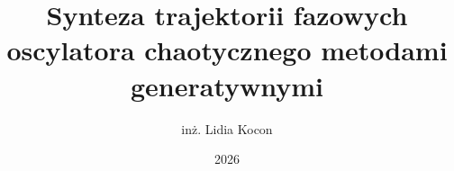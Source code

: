 \documentclass[thesis=mgr,faculty=ee]{EE-dyplom}
\title{Synteza trajektorii fazowych oscylatora chaotycznego metodami generatywnymi}
\author{inż. Lidia Kocon}
\date{2026}
\begin{document}
    \frontpages

    

    \bibliografia

    
   
    
    \listoffigures

  
\end{document}
